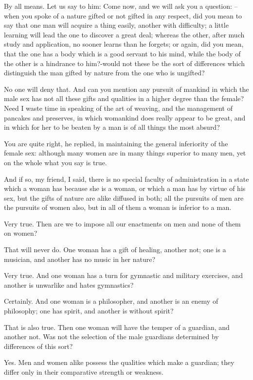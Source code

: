 By all means.
Let us say to him: Come now, and we will ask you a question: --when you spoke of a nature gifted or not gifted in any respect, did you mean to say that one man will acquire a thing easily, another with difficulty; a little learning will lead the one to discover a great deal; whereas the other, after much study and application, no sooner learns than he forgets; or again, did you mean, that the one has a body which is a good servant to his mind, while the body of the other is a hindrance to him?-would not these be the sort of differences which distinguish the man gifted by nature from the one who is ungifted?

No one will deny that.
And can you mention any pursuit of mankind in which the male sex has not all these gifts and qualities in a higher degree than the female? Need I waste time in speaking of the art of weaving, and the management of pancakes and preserves, in which womankind does really appear to be great, and in which for her to be beaten by a man is of all things the most absurd?

You are quite right, he replied, in maintaining the general inferiority of the female sex: although many women are in many things superior to many men, yet on the whole what you say is true.

And if so, my friend, I said, there is no special faculty of administration in a state which a woman has because she is a woman, or which a man has by virtue of his sex, but the gifts of nature are alike diffused in both; all the pursuits of men are the pursuits of women also, but in all of them a woman is inferior to a man.

Very true.
Then are we to impose all our enactments on men and none of them on women?

That will never do.
One woman has a gift of healing, another not; one is a musician, and another has no music in her nature?

Very true.
And one woman has a turn for gymnastic and military exercises, and another is unwarlike and hates gymnastics?

Certainly.
And one woman is a philosopher, and another is an enemy of philosophy; one has spirit, and another is without spirit?

That is also true.
Then one woman will have the temper of a guardian, and another not. Was not the selection of the male guardians determined by differences of this sort?

Yes.
Men and women alike possess the qualities which make a guardian; they differ only in their comparative strength or weakness.

